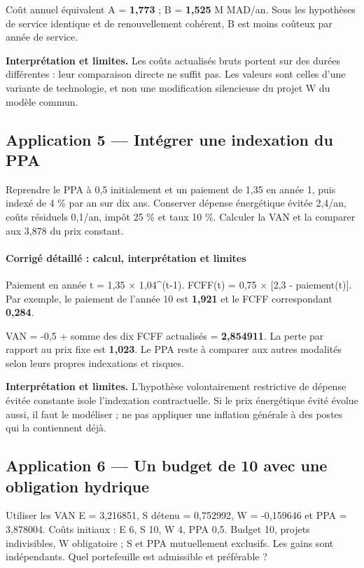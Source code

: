 \documentclass[12pt,a4paper]{article}
\begin{document}
Coût annuel équivalent A = \textbf{1,773} ; B = \textbf{1,525} M MAD/an. Sous les hypothèses de service identique et de renouvellement cohérent, B est moins coûteux par année de service.

\textbf{Interprétation et limites.} Les coûts actualisés bruts portent sur des durées différentes : leur comparaison directe ne suffit pas. Les valeurs sont celles d’une variante de technologie, et non une modification silencieuse du projet W du modèle commun.


\subsection*{Application 5 --- Intégrer une indexation du PPA}
Reprendre le PPA à 0,5 initialement et un paiement de 1,35 en année 1, puis indexé de 4 \% par an sur dix ans. Conserver dépense énergétique évitée 2,4/an, coûts résiduels 0,1/an, impôt 25 \% et taux 10 \%. Calculer la VAN et la comparer aux 3,878 du prix constant.


\paragraph{Corrigé détaillé : calcul, interprétation et limites}
Paiement en année t = 1,35 $\times$ 1,04\textasciicircum{}(t-1). FCFF(t) = 0,75 $\times$ [2,3 - paiement(t)]. Par exemple, le paiement de l’année 10 est \textbf{1,921} et le FCFF correspondant \textbf{0,284}.

VAN = -0,5 + somme des dix FCFF actualisés = \textbf{2,854911}. La perte par rapport au prix fixe est \textbf{1,023}. Le PPA reste à comparer aux autres modalités selon leurs propres indexations et risques.

\textbf{Interprétation et limites.} L’hypothèse volontairement restrictive de dépense évitée constante isole l’indexation contractuelle. Si le prix énergétique évité évolue aussi, il faut le modéliser ; ne pas appliquer une inflation générale à des postes qui la contiennent déjà.


\subsection*{Application 6 --- Un budget de 10 avec une obligation hydrique}
Utiliser les VAN E = 3,216851, S détenu = 0,752992, W = -0,159646 et PPA = 3,878004. Coûts initiaux : E 6, S 10, W 4, PPA 0,5. Budget 10, projets indivisibles, W obligatoire ; S et PPA mutuellement exclusifs. Les gains sont indépendants. Quel portefeuille est admissible et préférable ?
\end{document}
